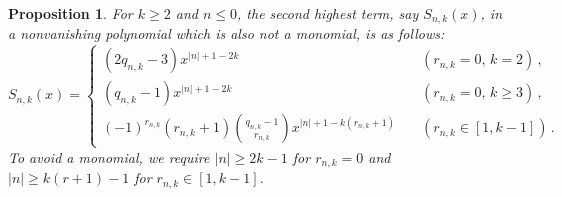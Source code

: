 \documentclass[review]{elsarticle}
\theoremstyle{plain}
\newtheorem{proposition}[theorem]{Proposition}
\begin{document}
\begin{proposition}\label{prop:sec_highest_neg}
For $k\ge2$ and $n\le0$, the second highest term, say $S_{n,k}(x)$, in a nonvanishing polynomial which is also not a monomial, is as follows:
\begin{equation}
\label{eq:sec_term_neg}    
S_{n,k}(x) = \begin{cases}
(2q_{n,k}-3)x^{|n|+1-2k} &\quad (r_{n,k}=0,\, k=2)\,,\phantom{\biggl|} \\
(q_{n,k}-1)x^{|n|+1-2k} &\quad (r_{n,k}=0,\, k\ge3)\,,\phantom{\biggl|} 
  \\ \displaystyle (-1)^{r_{n,k}} (r_{n,k}+1)\binom{q_{n,k}-1}{r_{n,k}}x^{|n|+1-k(r_{n,k}+1)} &\quad (r_{n,k}\in[1,k-1])\,. \end{cases} 
\end{equation}
To avoid a monomial, we require $|n|\ge 2k-1$ for $r_{n,k}=0$ and $|n|\ge k(r+1)-1$ for $r_{n,k}\in[1,k-1]$.
\end{proposition}
\end{document}
